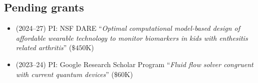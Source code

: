 \subsection{Pending grants}

\begin{itemize}
    \item (2024--27) PI: NSF DARE ``\textit{Optimal computational model-based design of affordable wearable technology to monitor biomarkers in kids with enthesitis related arthritis}'' ($\$450$K)
    \item (2023--24) PI: Google Research Scholar Program ``\textit{Fluid flow solver congruent with current quantum devices}'' ($\$60$K)
\end{itemize}
